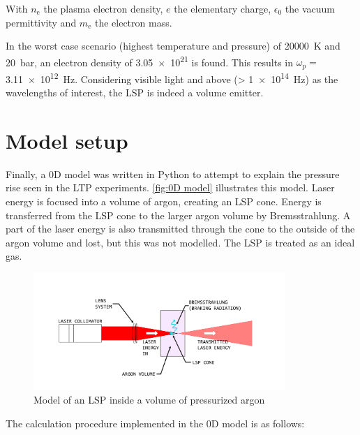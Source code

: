         With $n_\mathrm{e}$ the plasma electron density, $e$ the elementary charge, $\epsilon_\mathrm{0}$ the vacuum permittivity and $m_\mathrm{e}$ the electron mass.

        In the worst case scenario (highest temperature and pressure) of \qty{20000}{K} and \qty{20}{bar}, an electron density of \num{3.05e21} is found. This results in $\omega_p =$ \qty{3.11e12}{Hz}. Considering visible light and above (> \qty{1e14}{Hz}) as the wavelengths of interest, the LSP is indeed a volume emitter.

    \section{Model setup}
        
        Finally, a 0D model was written in Python to attempt to explain the pressure rise seen in the LTP experiments. \autoref{fig:0D model} illustrates this model. Laser energy is focused into a volume of argon, creating an LSP cone. Energy is transferred from the LSP cone to the larger argon volume by Bremsstrahlung. A part of the laser energy is also transmitted through the cone to the outside of the argon volume and lost, but this was not modelled. The LSP is treated as an ideal gas.

        \begin{figure}[!ht]
            \centering
            \includegraphics[width=0.85\textwidth]{assets/2 models/Modeling figure.pdf}
            \caption{Model of an LSP inside a volume of pressurized argon}
            \label{fig:0D model}
        \end{figure}

        The calculation procedure implemented in the 0D model is as follows:

